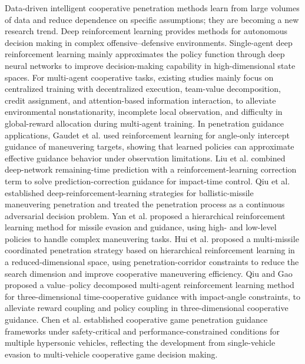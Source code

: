 \documentclass{cja}
\begin{document}
Data-driven intelligent cooperative penetration methods learn from large volumes of data and reduce dependence on specific assumptions; they are becoming a new research trend.
Deep reinforcement learning provides methods for autonomous decision making in complex offensive--defensive environments. Single-agent deep reinforcement learning mainly approximates the policy function through deep neural networks to improve decision-making capability in high-dimensional state spaces\cite{Mnih2015Nature,Schulman2017PPO}.
For multi-agent cooperative tasks, existing studies mainly focus on centralized training with decentralized execution\cite{Lowe2017MADDPG,Yu2022MAPPO}, team-value decomposition\cite{Sunehag2018VDN,Rashid2020JMLR}, credit assignment\cite{Foerster2018COMA}, and attention-based information interaction\cite{Iqbal2019MAAC}, to alleviate environmental nonstationarity, incomplete local observation, and difficulty in global-reward allocation during multi-agent training.
In penetration guidance applications, Gaudet et al.\cite{Gaudet2020AST} used reinforcement learning for angle-only intercept guidance of maneuvering targets, showing that learned policies can approximate effective guidance behavior under observation limitations. Liu et al.\cite{Liu2021AST} combined deep-network remaining-time prediction with a reinforcement-learning correction term to solve prediction-correction guidance for impact-time control. Qiu et al.\cite{Qiu2022JAE} established deep-reinforcement-learning strategies for ballistic-missile maneuvering penetration and treated the penetration process as a continuous adversarial decision problem. Yan et al.\cite{Yan2022SciRep} proposed a hierarchical reinforcement learning method for missile evasion and guidance, using high- and low-level policies to handle complex maneuvering tasks. Hui et al.\cite{Hui2025CJA} proposed a multi-missile coordinated penetration strategy based on hierarchical reinforcement learning in a reduced-dimensional space, using penetration-corridor constraints to reduce the search dimension and improve cooperative maneuvering efficiency. Qiu and Gao\cite{Qiu2024AST} proposed a value--policy decomposed multi-agent reinforcement learning method for three-dimensional time-cooperative guidance with impact-angle constraints, to alleviate reward coupling and policy coupling in three-dimensional cooperative guidance. Chen et al.\cite{Chen2024CJA,Chen2024TAES} established cooperative game penetration guidance frameworks under safety-critical and performance-constrained conditions for multiple hypersonic vehicles, reflecting the development from single-vehicle evasion to multi-vehicle cooperative game decision making.
\end{document}
